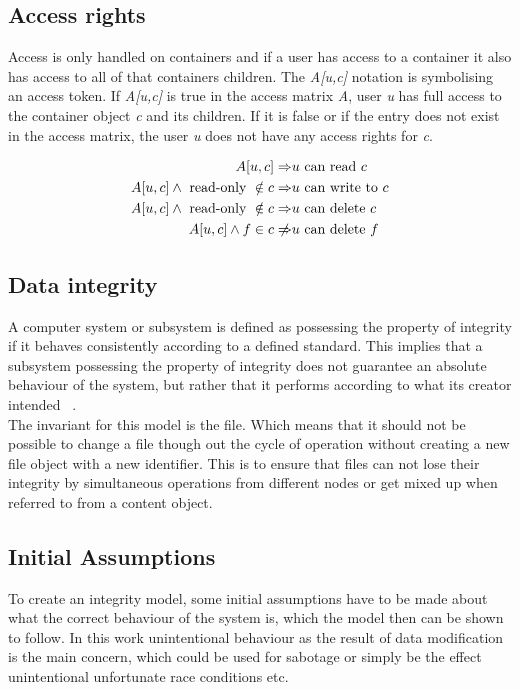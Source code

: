 \documentclass[a4paper,12pt]{article}
\begin{document}
\subsection{Access rights}
Access is only handled on containers and if a user has access to a container it also has access to
all of that containers children.
The \textit{A[u,c]} notation is symbolising an access token. If \textit{A[u,c]} is true in the 
access matrix \textit{A}, user \textit{u} has full access to the container object \textit{c} and its
children. If it is false or if the entry does not exist in the access matrix, the user \textit{u}
does not have any access rights for \textit{c}. 

\begin{equation}
    \begin{split}
        A[u,c] \Rightarrow & u \text{ can read } c \\
        A[u,c] \land \text{ read-only } \notin c \Rightarrow & u \text{ can write to } c \\
        A[u,c] \land \text{ read-only } \notin c \Rightarrow & u \text{ can delete } c \\
        A[u,c] \land f \in c \centernot\Rightarrow & u \text{ can delete } f 
    \end{split}
\end{equation}

\subsection{Data integrity}
A computer system or subsystem is defined as possessing the property of integrity if it behaves consistently
according to a defined standard. This implies that a subsystem possessing the property of integrity
does not guarantee an absolute behaviour of the system, but rather that it performs according to
what its creator intended ~\cite{BIBA}.
\\
The invariant for this model is the file. Which means that it should not be possible to
change a file though out the cycle of operation without creating a new file object with a new
identifier. This is to ensure that files can not lose their integrity by simultaneous
operations from different nodes or get mixed up when referred to from a content object. 

\subsection{Initial Assumptions}
To create an integrity model, some initial assumptions have to be made about what the correct
behaviour of the system is, which the model then can be shown to follow. In this work unintentional
behaviour as the result of data modification is the main concern, which could be used for sabotage
or simply be the effect unintentional unfortunate race conditions etc. 
\end{document}
